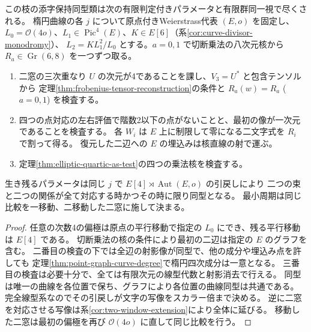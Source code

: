 \begin{corollary}\label{cor:elliptic-point-finite-atlas}
この枝の添字保持同型類は次の有限判定付きパラメータと有限群同一視で尽くされる。
楕円曲線の各 $j$ について原点付きWeierstrass代表 $(E,o)$ を固定し、
$L_0=\mathcal O(4o)$、$L_1\in\operatorname{Pic}^4(E)$、$K\in E[6]$（系\ref{cor:curve-divisor-monodromy}）、
$L_2=K L_1^2/L_0$ とする。$a=0,1$ で切断乗法の八次元核から
$R_a\in\operatorname{Gr}(6,8)$ を一つずつ取る。
\begin{enumerate}
\item 二窓の三次重なり $U$ の次元が4であることを課し、$V_3=U^*$ と包含テンソルから
定理\ref{thm:frobenius-tensor-reconstruction}の条件と $R_a(w)=R_a$ ($a=0,1$) を検査する。
\item 四つの点対応の左右評価で階数2以下の点がないことと、最初の像が一次元であることを検査する。
各 $W_i$ は $E$ 上に制限して零になる二文字式を $R_i$ で割って得る。
復元した二辺への $E$ の埋込みは核直線の射で運ぶ。
\item 定理\ref{thm:elliptic-quartic-as-test}の四つの乗法核を検査する。
\end{enumerate}
生き残るパラメータは同じ $j$ で $E[4]\rtimes\operatorname{Aut}(E,o)$ の引戻しにより
二つの束と二つの関係が全て対応する時かつその時に限り同型となる。
最小周期は同じ比較を一移動、二移動した二窓に施して決まる。
\end{corollary}
\begin{proof}
任意の次数4の偏極は原点の平行移動で指定の $L_0$ にでき、残る平行移動は $E[4]$ である。
切断乗法の核の条件により最初の二辺は指定の $E$ のグラフを含む。
二番目の検査の下では全辺の射影像が同型で、他の成分や埋込み点を許しても
定理\ref{thm:point-graph-curve-degree}で楕円四次成分は一意となる。
三番目の検査は必要十分で、全ては有限次元の線型代数と射影消去で行える。
同型は唯一の曲線を各位置で保ち、グラフにより各位置の曲線同型は共通である。
完全線型系なのでその引戻しが文字の写像をスカラー倍まで決める。
逆に二窓を対応させる写像は系\ref{cor:two-window-extension}により全体に延びる。
移動した二窓は最初の偏極を再び $\mathcal O(4o)$ に直して同じ比較を行う。
\end{proof}
